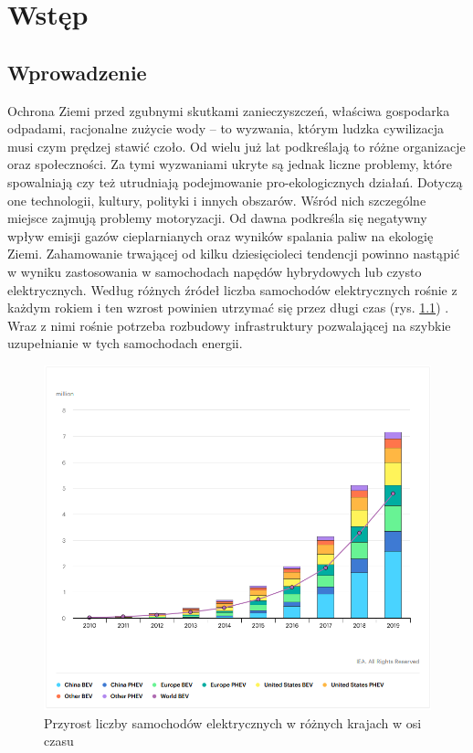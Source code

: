 \chapter{Wstęp}

\section{Wprowadzenie}
Ochrona Ziemi przed zgubnymi skutkami zanieczyszczeń, właściwa gospodarka odpadami, racjonalne zużycie wody -- to wyzwania, którym ludzka cywilizacja musi czym prędzej stawić czoło. Od wielu już lat podkreślają to różne organizacje oraz społeczności. Za tymi wyzwaniami ukryte są jednak liczne problemy, które spowalniają czy też utrudniają podejmowanie pro-ekologicznych działań. Dotyczą one technologii, kultury, polityki i innych obszarów. Wśród nich szczególne miejsce zajmują problemy motoryzacji. Od dawna podkreśla się negatywny wpływ emisji gazów cieplarnianych oraz wyników spalania paliw na ekologię Ziemi. Zahamowanie trwającej od kilku dziesięcioleci tendencji powinno nastąpić w wyniku zastosowania w samochodach napędów hybrydowych lub czysto elektrycznych. Według różnych źródeł liczba samochodów elektrycznych rośnie z każdym rokiem i ten wzrost powinien utrzymać się przez długi czas (rys. \ref{fig:car_chart}) \cite{iea1,mam1}. Wraz z nimi rośnie potrzeba rozbudowy infrastruktury pozwalającej na szybkie uzupełnianie w tych samochodach energii. 
\begin{figure}[ht]
    \centering
        \includegraphics[width=.65\linewidth]{rys01/chart.png}
        \caption{Przyrost liczby samochodów elektrycznych w różnych krajach w osi czasu \cite{car_chart}}
    \label{fig:car_chart}
\end{figure}

